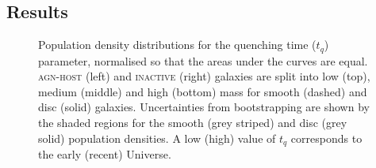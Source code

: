 \subsection{Results}\label{results}

\begin{figure}
\caption[Quenching time population density distributions for the \textsc{agn-host} and \textsc{inactive} samples] {Population density distributions for the quenching time ($t_q$) parameter, normalised so that the areas under the curves are equal. \textsc{agn-host} (left) and \textsc{inactive} (right) galaxies are split into low (top), medium (middle) and high (bottom) mass for smooth (dashed) and disc (solid) galaxies. Uncertainties from bootstrapping are shown by the shaded regions for the smooth (grey striped) and disc (grey solid) population densities. A low (high) value of $t_q$ corresponds to the early (recent) Universe.}
\label{time}
\end{figure}


